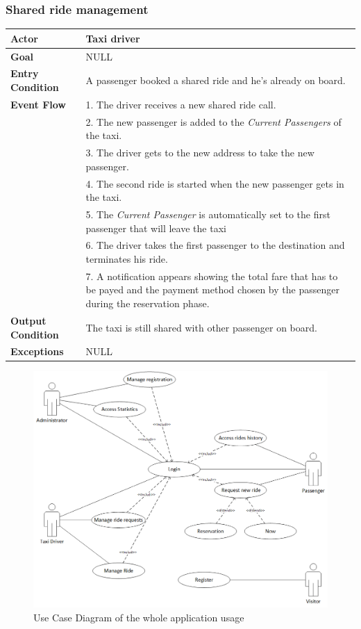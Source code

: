 \documentclass{article}
\begin{document}
\subsubsection{Shared ride management}
\begin{tabular}{| l | p{8cm} |}
\hline
\textbf{Actor}      &       Taxi driver \\
\hline
\textbf{Goal}       &       NULL\\
\hline
\textbf{Entry Condition} &  A passenger booked a shared ride and he's already on board.\\
\hline
\textbf{Event Flow}     &           1. The driver receives a new shared ride call.\\&
                                    2. The new passenger is added to the \textit{Current Passengers} of the taxi.\\&
                                    3. The driver gets to the new address to take the new passenger.\\&
                                    4. The second ride is started when the new passenger gets in the taxi.\\&
                                    5. The \textit{Current Passenger} is automatically set to the first passenger that will leave the taxi\\&
                                    6. The driver takes the first passenger to the destination and terminates his ride.\\&
                                    7. A notification appears showing the total fare that has to be payed and the payment method chosen by the passenger during the reservation phase.\\
\hline
\textbf{Output Condition} & The taxi is still shared with other passenger on board.\\
\hline
\textbf{Exceptions} &    NULL\\
\hline
\end{tabular}

\newpage


\begin{landscape}

\vfill
    \begin{figure}[h!]
        \centering
        \includegraphics[width=0.75\columnwidth]{UseCase/UCDiagram}
        \caption{Use Case Diagram of the whole application usage}
        \label{fig:usecase}
    \end{figure}
    \vfill
 \end{landscape}
 
\end{document}
